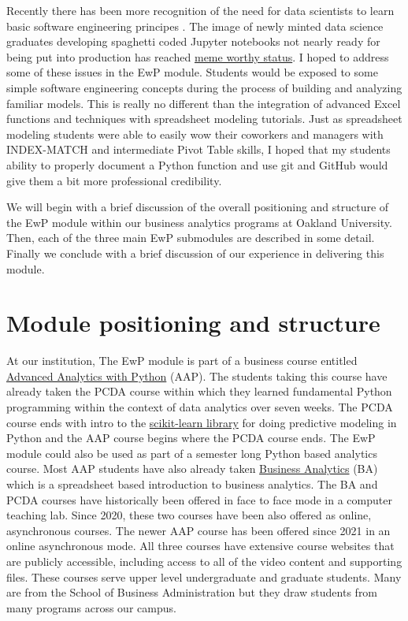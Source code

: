 \documentclass[ited,blindrev]{informs3}              %
\begin{document}
Recently there has been more recognition of the need for data scientists to learn basic software engineering principes \cite{nelsonSoftwareEngineeringData2024,treadwaySoftwareEngineeringData2023,rodriguesBuildingReproducibleAnalytical2023}.  The image of newly minted data science graduates developing spaghetti coded Jupyter notebooks not nearly ready for being put into production has reached \href{https://www.reddit.com/r/ProgrammerHumor/comments/y2xe3n/like_every_time_ever_when_the_devops_engineer/}{meme worthy status}. I hoped to address some of these issues in the EwP module. Students would be exposed to some simple software engineering concepts during the process of building and analyzing familiar models. This is really no different than the integration of advanced Excel functions and techniques with spreadsheet modeling tutorials. Just as spreadsheet modeling students were able to easily wow their coworkers and managers with INDEX-MATCH and intermediate Pivot Table skills, I hoped that my students ability to properly document a Python function and use git and GitHub would give them a bit more professional credibility.

We will begin with a brief discussion of the overall positioning and structure of the EwP module within our business analytics programs at Oakland University. Then, each of the three main EwP submodules are described in some detail. Finally we conclude with a brief discussion of our experience in delivering this module.

\section{Module positioning and structure}

At our institution, The EwP module is part of a business course entitled  \href{http://www.sba.oakland.edu/faculty/isken/courses/aap}{Advanced Analytics with Python} (AAP). The students taking this course have already taken the PCDA course within which they learned fundamental Python programming within the context of data analytics over seven weeks. The PCDA course ends with intro to the \href{https://scikit-learn.org/stable/index.html}{scikit-learn library} for doing predictive modeling in Python and the AAP course begins where the PCDA course ends. The EwP module could also be used as part of a semester long Python based analytics course. Most AAP students have also already taken   \href{http://www.sba.oakland.edu/faculty/isken/courses/ba}{Business Analytics} (BA) which is a spreadsheet based introduction to business analytics. The BA and PCDA courses have historically been offered in face to face mode in a computer teaching lab. Since 2020, these two courses have been also offered as online, asynchronous courses. The newer AAP course has been offered since 2021 in an online asynchronous mode. All three courses have extensive course websites that are publicly accessible, including access to all of the video content and supporting files. These courses serve upper level undergraduate and graduate students. Many are from the School of Business Administration but they draw students from many programs across our campus. 
\end{document}
